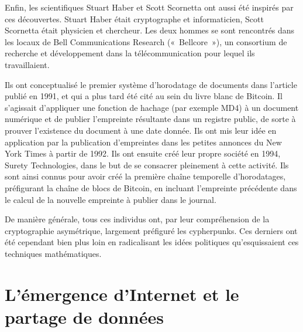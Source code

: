 Enfin, les scientifiques Stuart Haber et Scott Scornetta ont aussi été inspirés par ces découvertes. Stuart Haber était cryptographe et informaticien, Scott Scornetta était physicien et chercheur. Les deux hommes se sont rencontrés dans les locaux de Bell Communications Research («~Bellcore~»), un consortium de recherche et développement dans la télécommunication pour lequel ils travaillaient.

Ils ont conceptualisé le premier système d'horodatage de documents dans l'article  publié en 1991, et qui a plus tard été cité au sein du livre blanc de Bitcoin. Il s'agissait d'appliquer une fonction de hachage (par exemple MD4) à un document numérique et de publier l'empreinte résultante dans un registre public, de sorte à prouver l'existence du document à une date donnée. Ils ont mis leur idée en application par la publication d'empreintes dans les petites annonces du New York Times à partir de 1992. Ils ont ensuite créé leur propre société en 1994, Surety Technologies, dans le but de se consacrer pleinement à cette activité. Ils sont ainsi connus pour avoir créé la première chaîne temporelle d'horodatages, préfigurant la chaîne de blocs de Bitcoin, en incluant l'empreinte précédente dans le calcul de la nouvelle empreinte à publier dans le journal.

De manière générale, tous ces individus ont, par leur compréhension de la cryptographie asymétrique, largement préfiguré les cypherpunks. Ces derniers ont été cependant bien plus loin en radicalisant les idées politiques qu'esquissaient ces techniques mathématiques.

\section*{L'émergence d'Internet et le partage de données} %

